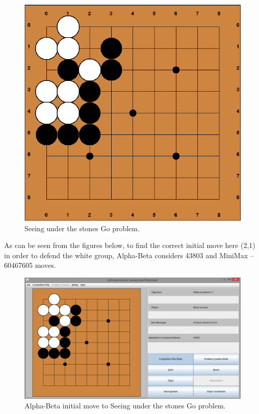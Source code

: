 \documentclass{l3proj}
\begin{document}
\begin{figure}[H]
\centering
\includegraphics[scale=0.5]{Images/UnderTheStones.png}
\caption{Seeing under the stones Go problem.}
\end{figure}

As can be seen from the figures below, to find the correct initial move here (2,1) in order to defend the white group, Alpha-Beta considers 43803 and MiniMax – 60467605 moves. 

\begin{figure}[H]
\centering
\includegraphics[scale=0.5]{Images/UnderTheStones_Alphabeta.png}
\caption{Alpha-Beta initial move to Seeing under the stones Go problem.}
\end{figure}
\end{document}
